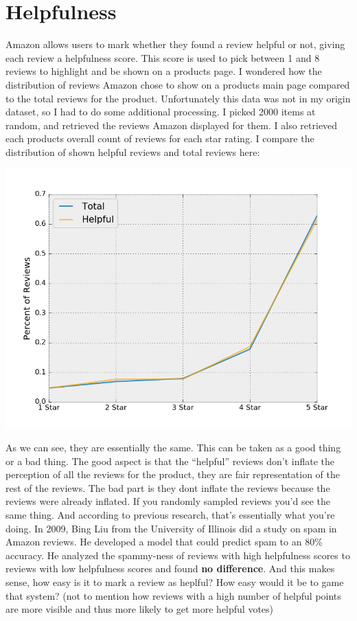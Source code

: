 \documentclass[a4paper,10pt]{article}
\begin{document}
\section*{Helpfulness}
Amazon allows users to mark whether they found a review helpful or not, giving each review a helpfulness score. This score is used to pick between 1 and 8 reviews to highlight and be shown on a products page. I wondered how the distribution of reviews Amazon chose to show on a products main page compared to the total reviews for the product. Unfortunately this data was not in my origin dataset, so I had to do some additional processing. I picked 2000 items at random, and retrieved the reviews Amazon displayed for them. I also retrieved each products overall count of reviews for each star rating. I compare the distribution of shown helpful reviews and total reviews here:
\begin{center}
    \includegraphics[scale=0.6]{helpfulness.png}
\end{center}
As we can see, they are essentially the same. This can be taken as a good thing or a bad thing. The good aspect is that the \enquote{helpful} reviews don't inflate the perception of all the reviews for the product, they are fair representation of the rest of the reviews. The bad part is they dont inflate the reviews because the reviews were already inflated. If you randomly sampled reviews you'd see the same thing. And according to previous research, that's essentially what you're doing. In 2009, Bing Liu from the University of Illinois did a study on spam in Amazon reviews. He developed a model that could predict spam to an 80\% accuracy. He analyzed the spammy-ness of reviews with high helpfulness scores to reviews with low helpfulness scores and found \textbf{no difference}. And this makes sense, how easy is it to mark a review as heplful? How easy would it be to game that system? (not to mention how reviews with a high number of helpful points are more visible and thus more likely to get more helpful votes)
\end{document}
